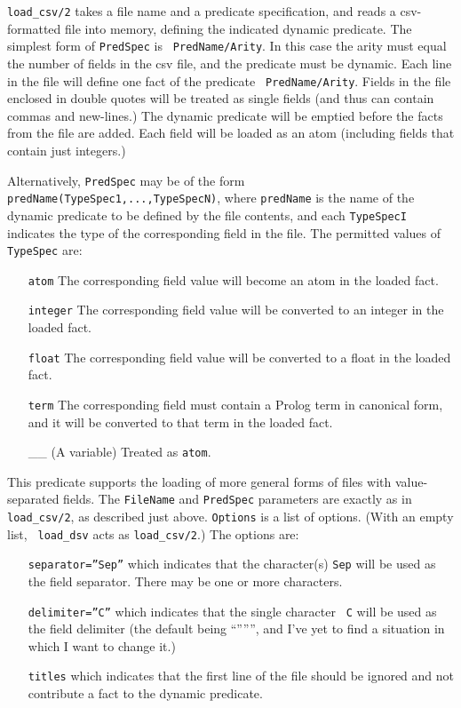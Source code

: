 \begin{description}

 

{\tt load\_csv/2} takes a file name and a predicate specification, and
reads a csv-formatted file into memory, defining the indicated dynamic
predicate.  The simplest form of {\tt PredSpec} is {\tt
PredName/Arity}.  In this case the arity must equal the number of
fields in the csv file, and the predicate must be dynamic.  Each line
in the file will define one fact of the predicate {\tt
PredName/Arity}.  Fields in the file enclosed in double quotes will
be treated as single fields (and thus can contain commas and
new-lines.)  The dynamic predicate will be emptied before the facts
from the file are added.  Each field will be loaded as an atom
(including fields that contain just integers.)

Alternatively, {\tt PredSpec} may be of the form {\tt
predName(TypeSpec1,...,TypeSpecN)}, where {\tt predName} is the name
of the dynamic predicate to be defined by the file contents, and each
{\tt TypeSpecI} indicates the type of the corresponding field in the
file.  The permitted values of {\tt TypeSpec} are:
\begin{itemize}
\item[{\tt atom}] The corresponding field value will become an atom in
the loaded fact.
\item[{\tt integer}] The corresponding field value will be converted
to an integer in the loaded fact.
\item[{\tt float}] The corresponding field value will be converted to
a float in the loaded fact.
\item[{\tt term}] The corresponding field must contain a Prolog term in
canonical form, and it will be converted to that term in the loaded
fact. 
\item[\_\_] (A variable) Treated as {\tt atom}.
\end{itemize}

 

This predicate supports the loading of more general forms of files
with value-separated fields.  The {\tt FileName} and {\tt PredSpec}
parameters are exactly as in {\tt load\_csv/2}, as described just
above.  {\tt Options} is a list of options.  (With an empty list, {\tt
load\_dsv} acts as {\tt load\_csv/2}.)  The options are:
\begin{itemize}
\item[{\tt separator=''Sep''}] which indicates that the character(s) {\tt Sep}
will be used as the field separator.  There may be one or more
characters. 
\item[{\tt delimiter=''C''}] which indicates that the single character {\tt
C} will be used as the field delimiter (the default being ``'''''',
and I've yet to find a situation in which I want to change it.)
\item[{\tt titles}] which indicates that the first line of the file should
be ignored and not contribute a fact to the dynamic predicate.
\end{itemize}


\end{description}
